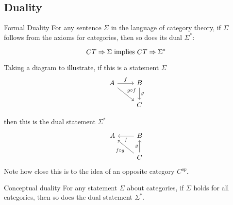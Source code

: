 \documentclass[../../notes.tex]{subfiles}
\begin{document}
\subsection{Duality}
\begin{proposition}{Formal Duality}
  For any sentence $\Sigma$ in the language of category theory, if $\Sigma$
  follows from the axioms for categories, then so does its dual $\Sigma^*$:

  $$ CT \Rightarrow \Sigma \textnormal{ implies } CT \Rightarrow \Sigma^* $$
\end{proposition}

Taking a diagram to illustrate, if this is a statement $\Sigma$
\[
  \begin{tikzcd}
    A \arrow[r, "f"] \arrow[dr, "g \circ f"] & B \arrow[d, "g"] \\
    & C
  \end{tikzcd}
\]

then this is the dual statement $\Sigma^*$
\[
  \begin{tikzcd}
    A  & B \arrow[l, "f"] \\
    & C \arrow[ul, "f \circ g"] \arrow[u, "g"]
  \end{tikzcd}
\]
Note how close this is to the idea of an opposite category $C^{op}$.

\begin{proposition}{Conceptual duality}
  For any statement $\Sigma$ about categories, if $\Sigma$ holds for
  all categories, then so does the dual statement $\Sigma^*$.
\end{proposition}
\end{document}
